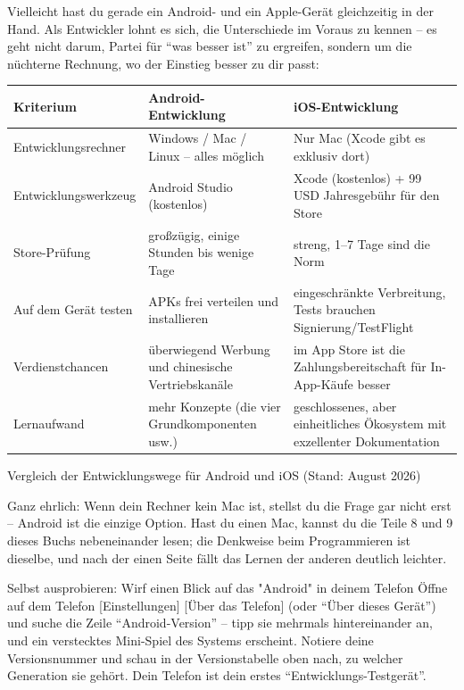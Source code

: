 Vielleicht hast du gerade ein Android- und ein Apple-Gerät gleichzeitig in der Hand. Als Entwickler lohnt es sich, die Unterschiede im Voraus zu kennen – es geht nicht darum, Partei für “was besser ist” zu ergreifen, sondern um die nüchterne Rechnung, wo der Einstieg besser zu dir passt:

\begin{center}
\begin{tabularx}{\linewidth}{|X|X|X|}
\hline
\textbf{Kriterium} & \textbf{Android-Entwicklung} & \textbf{iOS-Entwicklung} \tabularnewline
\hline
Entwicklungsrechner & Windows / Mac / Linux – alles möglich & Nur Mac (Xcode gibt es exklusiv dort) \tabularnewline
Entwicklungswerkzeug & Android Studio (kostenlos) & Xcode (kostenlos) + 99 USD Jahresgebühr für den Store \tabularnewline
Store-Prüfung & großzügig, einige Stunden bis wenige Tage & streng, 1–7 Tage sind die Norm \tabularnewline
Auf dem Gerät testen & APKs frei verteilen und installieren & eingeschränkte Verbreitung, Tests brauchen Signierung/TestFlight \tabularnewline
Verdienstchancen & überwiegend Werbung und chinesische Vertriebskanäle & im App Store ist die Zahlungsbereitschaft für In-App-Käufe besser \tabularnewline
Lernaufwand & mehr Konzepte (die vier Grundkomponenten usw.) & geschlossenes, aber einheitliches Ökosystem mit exzellenter Dokumentation \tabularnewline
\hline
\end{tabularx}
\end{center}

\begin{center}\small\color{gray}Vergleich der Entwicklungswege für Android und iOS (Stand: August 2026)\end{center}

Ganz ehrlich: Wenn dein Rechner kein Mac ist, stellst du die Frage gar nicht erst – Android ist die einzige Option. Hast du einen Mac, kannst du die Teile 8 und 9 dieses Buchs nebeneinander lesen; die Denkweise beim Programmieren ist dieselbe, und nach der einen Seite fällt das Lernen der anderen deutlich leichter.

\begin{tcbpractice}{Selbst ausprobieren: Wirf einen Blick auf das "Android" in deinem Telefon}
Öffne auf dem Telefon [Einstellungen] [Über das Telefon] (oder “Über dieses Gerät”) und suche die Zeile “Android-Version” – tipp sie mehrmals hintereinander an, und ein verstecktes Mini-Spiel des Systems erscheint. Notiere deine Versionsnummer und schau in der Versionstabelle oben nach, zu welcher Generation sie gehört. Dein Telefon ist dein erstes “Entwicklungs-Testgerät”.

\end{tcbpractice}

